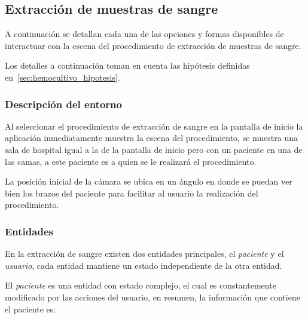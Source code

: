 \subsection{Extracción de muestras de sangre}

A continuación se detallan cada una de las opciones y formas disponibles de
interactuar con la escena del procedimiento de extracción de muestras de sangre.

Los detalles a continuación toman en cuenta las hipótesis definidas
en~\ref{sec:hemocultivo_hipotesis}. 

\subsubsection{Descripción del entorno}


Al seleccionar el procedimiento de extracción de sangre en la pantalla de inicio 
la aplicación inmediatamente muestra la escena del procedimiento, se muestra una 
sala de hospital igual a la de la pantalla de inicio pero con un paciente en una 
de las camas, a este paciente es a quien se le realizará el procedimiento.

La posición inicial de la cámara se ubica en un ángulo en donde se puedan ver 
bien los brazos del paciente para facilitar al usuario la realización del 
procedimiento.


\subsubsection{Entidades}


En la extracción de sangre existen dos entidades principales, el \emph{paciente}
y el \emph{usuario}, cada entidad mantiene un estado independiente de la otra
entidad.

El \emph{paciente} es una entidad con estado complejo, el cual es constantemente
modificado por las acciones del usuario, en resumen, la información que contiene
el paciente es:

